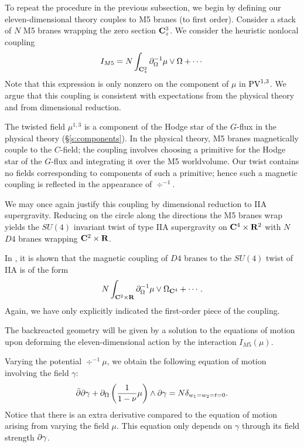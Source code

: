 \documentclass[../main.tex]{subfiles}
\begin{document}

To repeat the procedure in the previous subsection, we begin by defining our eleven-dimensional theory couples to M5 branes (to first order).
Consider a stack of $N$ M5 branes wrapping the zero section $\mathbf{C}^3_z$. 
We consider the heuristic nonlocal coupling 
\[
I_{M5} = N\int_{\mathbf{C}^3_z} \partial_{\Omega}^{-1}\mu \vee \Omega +\cdots 
\]
Note that this expression is only nonzero on the component of $\mu$ in $\text{PV}^{1,3}$. 
We argue that this coupling is consistent with expectations from the physical theory and from dimensional reduction. 

The twisted field $\mu^{1,3}$ is a component of the Hodge star of the $G$-flux in the physical theory (\S\ref{s:components}). 
In the physical theory, M5 branes magnetically couple to the $C$-field; the coupling involves choosing a primitive for the Hodge star of the $G$-flux and integrating it over the M5 worldvolume. Our twist contains no fields corresponding to components of such a primitive; hence such a magnetic coupling is reflected in the appearance of $\div^{-1}$. 

We may once again justify this coupling by dimensional reduction to IIA supergravity. Reducing on the circle along the directions the M5 branes wrap yields the $SU(4)$ invariant twist of type IIA supergravity on $\mathbf{C}^4 \times \mathbf{R}^2$ with $N$ $D4$ branes wrapping $\mathbf{C}^2 \times \mathbf{R}$. 

In \cite{CLsugra}, it is shown that the magnetic coupling of $D4$ branes to the $SU(4)$ twist of IIA is of the form
\[
N \int _{\mathbf{C}^2 \times \mathbf{R}} \partial_{\Omega}^{-1} \mu \vee \Omega_{\mathbf{C}^4} + \cdots .
\]
Again, we have only explicitly indicated the first-order piece of the coupling. 

\parsec[s:m5backreact]

The backreacted geometry will be given by a solution to the equations of motion upon deforming the eleven-dimensional action by the interaction $I_{M5}(\mu)$. 

Varying the potential $\div^{-1} \mu$, we obtain the following equation of motion involving the field $\gamma$:
\begin{equation}\label{eqn:m5eom1}
\bar{\partial} \partial \gamma + \partial_{\Omega} \left(\frac{1}{1-\nu} \mu\right) \wedge \partial \gamma = N \delta_{w_1=w_2=t=0} .
\end{equation}
Notice that there is an extra derivative compared to the equation of motion arising from varying the field $\mu$. 
This equation only depends on $\gamma$ through its field strength $\partial \gamma$. 
\end{document}
